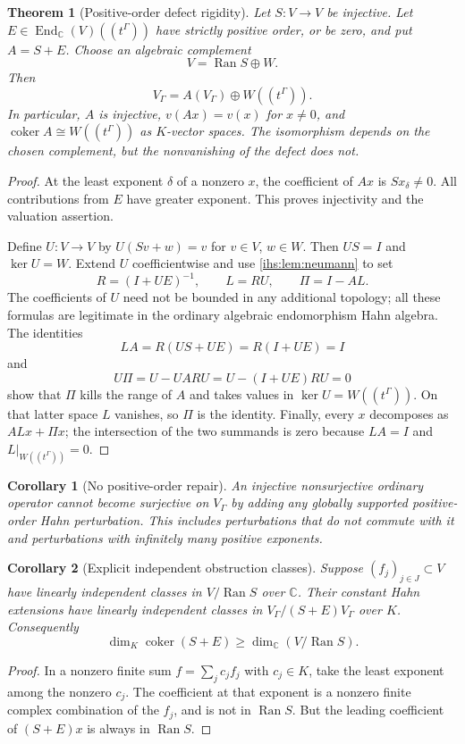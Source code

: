 \documentclass[11pt,a4paper]{article}
\numberwithin{equation}{section}
\newtheorem{theorem}{Theorem}[section]
\newtheorem{corollary}[corollary]{Corollary}
\theoremstyle{definition}
\theoremstyle{remark}
\newcommand{\C}{\mathbb C}
\newcommand{\K}{K}
\newcommand{\Ran}{\operatorname{Ran}}
\newcommand{\End}{\operatorname{End}}
\newcommand{\coker}{\operatorname{coker}}
\begin{document}
\begin{theorem}[Positive-order defect rigidity]\label{ihs:hh:thm:defect}
Let $S:V\to V$ be injective. Let $E\in\End_\C(V)((t^\Gamma))$ have strictly
positive order, or be zero, and put $A=S+E$. Choose an algebraic complement
\begin{equation}\label{ihs:hh:eq:complement}
 V=\Ran S\oplus W.
\end{equation}
Then
\begin{equation}\label{ihs:hh:eq:defectdecomp}
 V_\Gamma=A(V_\Gamma)\oplus W((t^\Gamma)).
\end{equation}
In particular, $A$ is injective, $v(Ax)=v(x)$ for $x\ne0$, and
$\coker A\cong W((t^\Gamma))$ as $\K$-vector spaces. The isomorphism depends
on the chosen complement, but the nonvanishing of the defect does not.
\end{theorem}
\begin{proof}
At the least exponent $\delta$ of a nonzero $x$, the coefficient of $Ax$ is
$Sx_\delta\ne0$. All contributions from $E$ have greater exponent. This
proves injectivity and the valuation assertion.

Define $U:V\to V$ by $U(Sv+w)=v$ for $v\in V$, $w\in W$. Then $US=I$ and
$\ker U=W$. Extend $U$ coefficientwise and use \cref{ihs:lem:neumann} to set
\[
 R=(I+UE)^{-1},\qquad L=RU,\qquad \Pi=I-AL.
\]
The coefficients of $U$ need not be bounded in any additional topology; all
these formulas are legitimate in the ordinary algebraic endomorphism Hahn
algebra. The identities
\[
 LA=R(US+UE)=R(I+UE)=I
\]
and
\[
 U\Pi=U-UA R U=U-(I+UE)R U=0
\]
show that $\Pi$ kills the range of $A$ and takes values in
$\ker U=W((t^\Gamma))$. On that latter space $L$ vanishes, so $\Pi$ is the
identity. Finally, every $x$ decomposes as $ALx+\Pi x$; the intersection of
the two summands is zero because $LA=I$ and $L|_{W((t^\Gamma))}=0$.
\end{proof}

\begin{corollary}[No positive-order repair]\label{ihs:hh:cor:norepair}
An injective nonsurjective ordinary operator cannot become surjective on
$V_\Gamma$ by adding any globally supported positive-order Hahn
perturbation. This includes perturbations that do not commute with it and
perturbations with infinitely many positive exponents.
\end{corollary}

\begin{corollary}[Explicit independent obstruction classes]\label{ihs:hh:cor:independent}
Suppose $(f_j)_{j\in J}\subset V$ have linearly independent classes in
$V/\Ran S$ over $\C$. Their constant Hahn extensions have linearly
independent classes in $V_\Gamma/(S+E)V_\Gamma$ over $\K$. Consequently
\[
 \dim_\K\coker(S+E)\ge\dim_\C(V/\Ran S).
\]
\end{corollary}
\begin{proof}
In a nonzero finite sum $f=\sum_j c_j f_j$ with $c_j\in\K$, take the least
exponent among the nonzero $c_j$. The coefficient at that exponent is a
nonzero finite complex combination of the $f_j$, and is not in $\Ran S$. But
the leading coefficient of $(S+E)x$ is always in $\Ran S$.
\end{proof}
\end{document}
